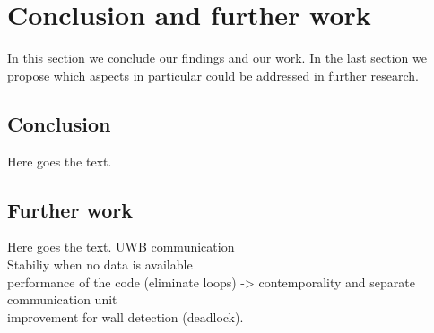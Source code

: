 
\chapter{Conclusion and further work} %

\label{Chapter6} %
In this section we conclude our findings and our work. In the last section we propose which aspects in particular could be addressed in further research. 


\section{Conclusion}
Here goes the text.


\section{Further work}
Here goes the text.
UWB communication\\
Stabiliy when no data is available\\
performance of the code (eliminate loops) -> contemporality and separate communication unit\\
improvement for wall detection (deadlock).\\